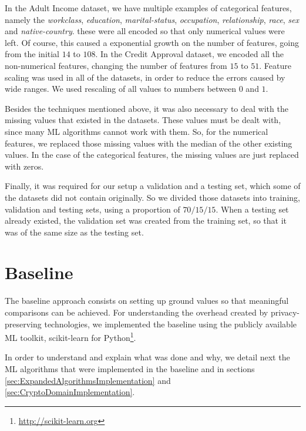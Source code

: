 In the Adult Income dataset, we have multiple examples of categorical features, namely the \textit{workclass}, \textit{education}, \textit{marital-status}, \textit{occupation}, \textit{relationship}, \textit{race}, \textit{sex} and \textit{native-country}. these were all encoded so that only numerical values were left. Of course, this caused a exponential growth on the number of features, going from the initial $14$ to $108$.
In the Credit Approval dataset, we encoded all the non-numerical features, changing the number of features from $15$ to $51$.
Feature scaling was used in all of the datasets, in order to reduce the errors caused by wide ranges. We used rescaling of all values to numbers between $0$ and $1$.

Besides the techniques mentioned above, it was also necessary to deal with the missing values that existed in the datasets. These values must be dealt with, since many \ac{ML} algorithms cannot work with them. So, for the numerical features, we replaced those missing values with the median of the other existing values. In the case of the categorical features, the missing values are just replaced with zeros. 

Finally, it was required for our setup a validation and a testing set, which some of the datasets did not contain originally. So we divided those datasets into training, validation and testing sets, using a proportion of $70/15/15$. When a testing set already existed, the validation set was created from the training set, so that it was of the same size as the testing set.


\section{Baseline}
\label{sec:BaselineImplementation}

The baseline approach consists on setting up ground values so that meaningful comparisons can be achieved. For understanding the overhead created by privacy-preserving technologies, we implemented the baseline using the publicly available \ac{ML} toolkit, scikit-learn for Python\footnote{\url{http://scikit-learn.org}}.

In order to understand and explain what was done and why, we detail next the \ac{ML} algorithms that were implemented in the baseline and in sections \ref{sec:ExpandedAlgorithmsImplementation} and \ref{sec:CryptoDomainImplementation}.

